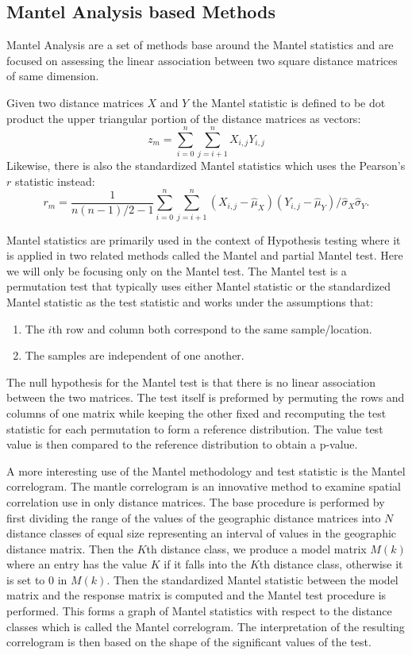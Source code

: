 \subsection*{Mantel Analysis based Methods}
    Mantel Analysis  are a set of methods base around the
    Mantel statistics and are focused on assessing the linear association between two square distance matrices
        of same dimension.

    Given two distance matrices $X$ and $Y$ the Mantel statistic is defined to be dot product the upper triangular
    portion of the distance matrices as vectors:
    \[z_{m} =  \sum_{i=0}^{n} \sum_{j=i+1}^{n} X_{i,j}Y_{i,j}\]
    Likewise, there is also the standardized Mantel statistics which uses the Pearson's $r$ statistic instead:
    \[r_{m} =   \frac{1}{n(n-1)/2-1} \sum_{i=0}^{n} \sum_{j=i+1}^{n}
                (X_{i,j}-\hat{\mu}_X)(Y_{i,j}-\hat{\mu}_Y)/\hat{\sigma}_X\hat{\sigma}_Y.
    \]

    Mantel statistics are primarily used in the context of Hypothesis testing where it is applied in two
        related methods called the Mantel and partial Mantel test.
    Here we will only be focusing only on the Mantel test.
    The Mantel test is a permutation test that typically uses either Mantel statistic or the standardized Mantel statistic as the
    test statistic and works under the assumptions that:
    \begin{enumerate}
        \item   The $i$th row and column both correspond to the same sample/location.
        \item   The samples are independent of one another.
    \end{enumerate}
    The null hypothesis for the Mantel test is that there is no linear association between the two matrices.
    The test itself is preformed by permuting the rows and columns of one matrix while keeping the other fixed and recomputing
        the test statistic for each permutation to form a reference distribution.
    The value test value is then compared to the reference distribution to obtain a p-value.

A more interesting use of the Mantel methodology and test statistic is the Mantel correlogram.
The mantle correlogram is an innovative method to examine spatial correlation use in only distance matrices.
The base procedure is performed by first dividing the range of the values of the geographic distance matrices into $N$ distance classes of equal size representing an interval of values in the geographic distance matrix.
Then the $K$th distance class, we produce a model matrix $M(k)$ where an entry has the value $K$ if it falls into the $K$th distance class, otherwise it is set to 0 in $M(k)$.
Then the standardized Mantel statistic between the model matrix and the response matrix is computed and the Mantel test procedure is performed.
This forms a graph of Mantel statistics with respect to the distance classes which is called the Mantel correlogram.
The interpretation of the resulting correlogram is then based on the shape of the significant values of the test.

